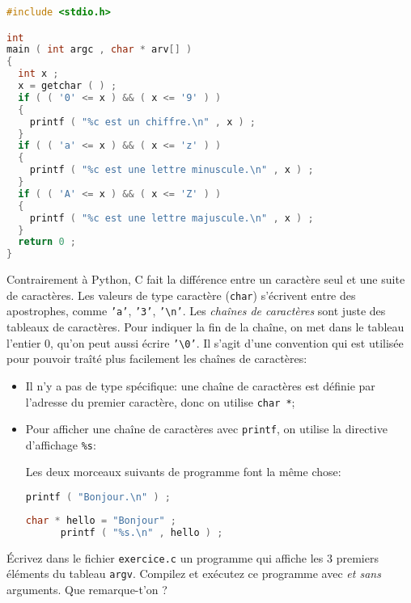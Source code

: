\begin{solution}
  \begin{lstlisting}[language=C]
#include <stdio.h>

int 
main ( int argc , char * arv[] ) 
{ 
  int x ; 
  x = getchar ( ) ;
  if ( ( '0' <= x ) && ( x <= '9' ) ) 
  { 
    printf ( "%c est un chiffre.\n" , x ) ;
  } 
  if ( ( 'a' <= x ) && ( x <= 'z' ) ) 
  { 
    printf ( "%c est une lettre minuscule.\n" , x ) ;
  } 
  if ( ( 'A' <= x ) && ( x <= 'Z' ) ) 
  { 
    printf ( "%c est une lettre majuscule.\n" , x ) ;
  } 
  return 0 ; 
}
  \end{lstlisting}
\end{solution}


\prerequis {}
Contrairement à Python, C fait la différence entre un caractère seul
et une suite de caractères.  Les valeurs de type caractère
(\texttt{char}) s'écrivent entre des apostrophes, comme \texttt{'a'},
\texttt{'3'}, \texttt{'\textbackslash n'}. Les \emph{chaînes de
  caractères} sont juste des tableaux de caractères. Pour indiquer la
fin de la chaîne, on met dans le tableau l'entier \(0\), qu'on peut
aussi écrire \texttt{'\textbackslash 0'}. Il s'agit d'une convention
qui est utilisée pour pouvoir traîté plus facilement les chaînes de
caractères:
\begin{itemize}
\item Il n'y a pas de type spécifique: une chaîne de caractères est
  définie par l'adresse du premier caractère, donc on utilise \texttt{char *};
\item Pour afficher une chaîne de caractères avec \texttt{printf}, on
  utilise la directive d'affichage \texttt{\%s}:
  \begin{exemple}
    Les deux morceaux suivants de programme font la même chose:
    \begin{lstlisting}[language=C]
      printf ( "Bonjour.\n" ) ;
    \end{lstlisting}
    \begin{lstlisting}[language=C]
      char * hello = "Bonjour" ;
      printf ( "%s.\n" , hello ) ;
    \end{lstlisting}
  \end{exemple}
\end{itemize}

\question Écrivez dans le fichier
\texttt{exercice.c} un programme qui affiche les 3
premiers éléments du tableau \texttt{argv}. Compilez et exécutez ce
programme avec \emph{et sans} arguments. Que remarque-t'on ?

